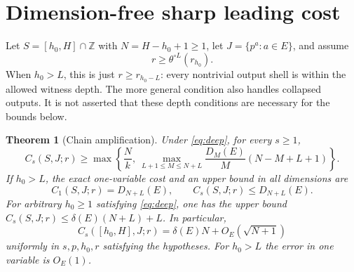 \documentclass[11pt]{article}
\newtheorem{theorem}{Theorem}[section]
\theoremstyle{definition}
\newcommand{\Z}{\mathbb Z}
\begin{document}
\section{Dimension-free sharp leading cost}\label{sec:main}

Let $S=[h_0,H]\cap\Z$ with $N=H-h_0+1\ge1$, let $J=\{p^a:a\in E\}$, and assume
\begin{equation}\label{eq:deep}
 r\ge\theta^{\circ L}(r_{h_0}).
\end{equation}
When $h_0>L$, this is just $r\ge r_{h_0-L}$: every nontrivial output shell is within the allowed witness depth. The more general condition also handles collapsed outputs. It is not asserted that these depth conditions are necessary for the bounds below.

\begin{theorem}[Chain amplification]\label{thm:main}
Under \eqref{eq:deep}, for every $s\ge1$,
\begin{equation}\label{eq:chain}
 C_s(S,J;r)\ge \max\left\{\frac N k,\ \max_{L+1\le M\le N+L}\frac{D_M(E)}{M}(N-M+L+1)\right\}.
\end{equation}
If $h_0>L$, the exact one-variable cost and an upper bound in all dimensions are
\begin{equation}\label{eq:upper}
 C_1(S,J;r)=D_{N+L}(E),\qquad C_s(S,J;r)\le D_{N+L}(E).
\end{equation}
For arbitrary $h_0\ge1$ satisfying \eqref{eq:deep}, one has the upper bound $C_s(S,J;r)\le\delta(E)(N+L)+L$. In particular,
\begin{equation}\label{eq:asymp}
 \boxed{\displaystyle C_s([h_0,H],J;r)=\delta(E)N+O_E(\sqrt{N+1})}
\end{equation}
uniformly in $s,p,h_0,r$ satisfying the hypotheses. For $h_0>L$ the error in one variable is $O_E(1)$.
\end{theorem}
\end{document}
